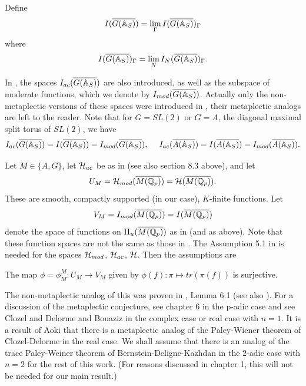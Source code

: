 Define
\begin{equation}
I(\overline{G({\Bbb{A}}_S)})
=\lim_{\Gamma}
I(\overline{G({\Bbb{A}}_S)})_\Gamma
\end{equation}
where
\[
I(\overline{G({\Bbb{A}}_S)})_\Gamma
=\lim_N
I_N(\overline{G({\Bbb{A}}_S)})_\Gamma .
\]

In \cite{A11}, the spaces $I_{ac}(\overline{G({\Bbb{A}}_S)})$ are also
introduced, as well as the subspace of moderate functions,
which we denote by $I_{mod}(\overline{G({\Bbb{A}}_S)})$.
Actually only the non-metaplectic versions of these spaces
were introduced in \cite{A11}, their metaplectic analogs are left
to the reader.
Note that for $G=SL(2)$ or $G=A$, the diagonal maximal split torus
of $SL(2)$, we have
\[
I_{ac}(\overline{G({\Bbb{A}}_S)})=I(\overline{G({\Bbb{A}}_S)})
=I_{mod}(\overline{G({\Bbb{A}}_S)}),
\ \ \ \ 
I_{ac}(\overline{A({\Bbb{A}}_S)})
=I(\overline{A({\Bbb{A}}_S)})
=I_{mod}(\overline{A({\Bbb{A}}_S)}).
\]

Let $M\in \{A,G\}$, let ${\cal{H}}_{ac}$ be as in
\cite{A11} (see also section 8.3 above),
and let 
\[
U_M={\cal{H}}_{mod}(\overline{M({\Bbb{Q}}_p)})
={\cal{H}}(\overline{M({\Bbb{Q}}_p)}) .
\]
These are smooth, compactly supported (in our case), $K$-finite
functions. Let 
\[
V_M=I_{mod}(\overline{M({\Bbb{Q}}_p)}) =I(\overline{M({\Bbb{Q}}_p)})
\]
denote the space of functions on $\Pi _u(\overline{M({\Bbb{Q}}_p)})$ as
in \cite{A11} (and as above).
Note that these function spaces are not the same as those in \cite{A6}.
The Assumption 5.1 in \cite{A6} is needed for
the spaces ${\cal H}_{mod}$, ${\cal H}_{ac}$, ${\cal H}$.
Then the assumptions are

\begin{conjecture}
The map $\phi=\phi_M^M :U_M\rightarrow V_M$ given by
$\phi (f):\pi \longmapsto tr(\pi (f)) $ is surjective.
\end{conjecture}

The non-metaplectic analog of this
was proven in \cite{A10}, Lemma 6.1 (see also \cite{BDK}).
For a discussion of the metaplectic conjecture, see chapter 6
in the p-adic case and see
Clozel and Delorme \cite{CD} and Bouaziz \cite{Bou} in the complex case
or real case with $n=1$. It is a result
of Aoki \cite{Ao} that there is a
metaplectic analog of the Paley-Wiener theorem of
Clozel-Delorme in the real case. We shall
assume that there is an analog of the trace Paley-Weiner
theorem of Bernstein-Deligne-Kazhdan in the $2$-adic case
with $n=2$ for the rest
of this work. (For reasons discussed in chapter 1,
this will not be needed for our main result.)


